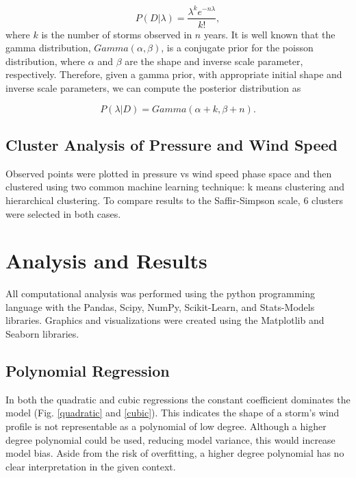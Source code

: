 \documentclass{article}
\begin{document}
		\begin{equation}
			P(D | \lambda) = \frac{\lambda^k e^{-n \lambda}}{k!},
		\end{equation}
		where $k$ is the number of storms observed in $n$ years. It is well known that the gamma distribution, $Gamma(\alpha, \beta)$, is a conjugate prior for the poisson distribution, where $\alpha$ and $\beta$ are the shape and inverse scale parameter, respectively. Therefore, given a gamma prior, with appropriate initial shape and inverse scale parameters, we can compute the posterior distribution as
		
		\begin{equation}
			P(\lambda | D) = Gamma(\alpha + k, \beta + n).
		\end{equation}
		

	\subsection{Cluster Analysis of Pressure and Wind Speed}
	Observed points were plotted in pressure vs wind speed phase space and then clustered using two common machine learning technique: k means clustering and hierarchical clustering. To compare results to the Saffir-Simpson scale\cite{}, 6 clusters were selected in both cases.

	\section{Analysis and Results}
		 All computational analysis was performed using the python programming language with the Pandas, Scipy, NumPy, Scikit-Learn, and Stats-Models libraries\cite{mckinney2010data, scipy, walt2011numpy, scikit-learn, statsmodels2010}. Graphics and visualizations were created using the Matplotlib and Seaborn libraries\cite{hunter2007matplotlib, michael_waskom_2014_12710}.
		 
	\subsection{Polynomial Regression}
	In both the quadratic and cubic regressions the constant coefficient dominates the model (Fig. \ref{quadratic} and \ref{cubic}). This indicates the shape of a storm's wind profile is not representable as a polynomial of low degree. Although a higher degree polynomial could be used, reducing model variance, this would increase model bias. Aside from the risk of overfitting, a higher degree polynomial has no clear interpretation in the given context.
\end{document}
